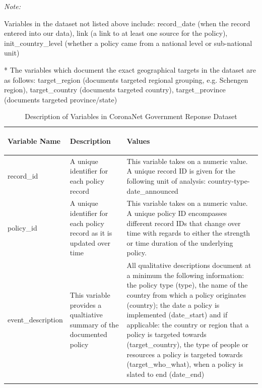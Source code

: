\documentclass[]{article}
\begin{document}
\begingroup\fontsize{10}{12}\selectfont

\begin{ThreePartTable}
\begin{TableNotes}[para]
\small
\item \textit{Note: } 
\item Variables in the dataset not listed above include: record\_date (when the record entered into our data), link (a link to at least one source for the policy), init\_country\_level (whether a policy came from a national level or sub-national unit)
\item[*] The variables which document the exact geographical targets in the dataset are as follows: target\_region (documents targeted regional grouping, e.g. Schengen region), target\_country (documents targeted country), target\_province (documents targeted province/state)
\end{TableNotes}
\begin{longtable}{>{\bfseries\raggedright\arraybackslash}p{3.5cm}>{\raggedright\arraybackslash}p{5cm}>{\raggedright\arraybackslash}p{8.5cm}}
\caption{\label{tab:vardesc}Description of Variables in CoronaNet Government Reponse Dataset}\\
\toprule
\textbf{Variable Name} & \textbf{Description} & \textbf{Values}\\
\midrule
\rowcolor{gray!6}  record\_id & A unique identifier for each policy record & This variable takes on a numeric value. A unique record ID is given for the following unit of analysis: country-type-date\_announced\\
policy\_id & A unique identifier for each policy record as it is updated over time & This variable takes on a numeric value. A unique policy ID encompasses different record IDs that change over time with regards to either the strength or time duration of the underlying policy.\\
\rowcolor{gray!6}  event\_description & This variable provides a qualtiative summary of the documented policy & All qualitative descriptions document at a minimum the following information: the policy type (type), the name of the country from which a policy originates (country); the date a policy is implemented (date\_start) and if applicable:  the country or region that a policy is targeted towards (target\_country), the type of people or resources a policy is targeted towards (target\_who\_what), when a policy is slated to end (date\_end)\\
\addlinespace[0.3em]
\multicolumn{3}{l}{\textbf{Monadic Variables}}\\

\end{longtable}
\end{ThreePartTable}
\end{document}
